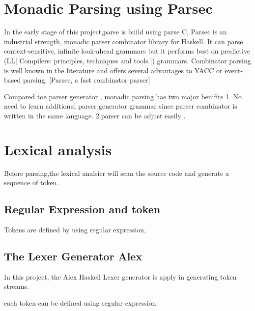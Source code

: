 \section{Monadic Parsing using Parsec}
In the early stage of this project,parse is build using parse C,
Parsec is an industrial strength, monadic parser combinator library for Haskell. It can parse context-sensitive, infinite look-ahead grammars but it performs best on
predictive (LL[ Compilers: principles, techniques and tools.]) grammars. Combinator parsing is well known in the literature
and offers several advantages to YACC or event-based parsing. [Parsec, a fast combinator parser] 

Compared toe parser generator , monadic parsing has two major benifits
1. No need to learn additional parser generator grammar since parser combinator is written in the same language. 2.parser can be adjust easily .






\section {Lexical analysis}
Before parsing,the lexical analsier will scan the source code and generate a sequence of token.


\subsection{Regular Expression and token}
Tokens are defined by using regular expression,

\subsection{The Lexer Generator Alex}
In this project, the Alex Haskell Lexer generator is apply in generating token streams.

each token can be defined using regular expression.







